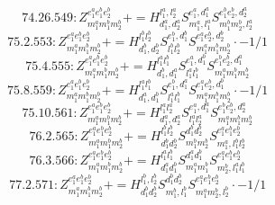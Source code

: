\documentclass[letterpaper,10pt,fleqn,leqno,onecolumn]{article}
\begin{document}
\begin{equation} \;\;\;\;\;\;  74.26.549: Z^{e_{1}^{a}e_{1}^{b}e_{2}^{b}}_{m_{1}^{a}m_{1}^{b}m_{2}^{b}}+=H^{l_{1}^{a},l_{2}^{a}}_{d_{1}^{a},d_{2}^{a}}S^{e_{1}^{a},d_{1}^{a}}_{m_{1}^{a},l_{1}^{a}}S^{e_{1}^{b}e_{2}^{b},d_{2}^{a}}_{m_{1}^{b}m_{2}^{b},l_{2}^{a}} \end{equation}
\begin{equation} \;\;\;\;\;\;  75.2.553: Z^{e_{1}^{a}e_{1}^{b}e_{2}^{b}}_{m_{1}^{a}m_{1}^{b}m_{2}^{b}}+=H^{l_{1}^{b}l_{2}^{b}}_{d_{1}^{b},d_{2}^{b}}S^{e_{1}^{b},d_{1}^{b}}_{l_{1}^{b}l_{2}^{b}}S^{e_{1}^{a}e_{2}^{b},d_{2}^{b}}_{m_{1}^{a}m_{1}^{b}m_{2}^{b}}\cdot -1/1 \end{equation}
\begin{equation} \;\;\;\;\;\;  75.4.555: Z^{e_{1}^{a}e_{1}^{b}e_{2}^{b}}_{m_{1}^{a}m_{1}^{b}m_{2}^{b}}+=H^{l_{1}^{a}l_{1}^{b}}_{d_{1}^{b},d_{1}^{a}}S^{e_{1}^{a},d_{1}^{b}}_{l_{1}^{a}l_{1}^{b}}S^{e_{1}^{b}e_{2}^{b},d_{1}^{a}}_{m_{1}^{a}m_{1}^{b}m_{2}^{b}} \end{equation}
\begin{equation} \;\;\;\;\;\;  75.8.559: Z^{e_{1}^{a}e_{1}^{b}e_{2}^{b}}_{m_{1}^{a}m_{1}^{b}m_{2}^{b}}+=H^{l_{1}^{a}l_{1}^{b}}_{d_{1}^{a},d_{1}^{b}}S^{e_{1}^{b},d_{1}^{a}}_{l_{1}^{a}l_{1}^{b}}S^{e_{1}^{a}e_{2}^{b},d_{1}^{b}}_{m_{1}^{a}m_{1}^{b}m_{2}^{b}}\cdot -1/1 \end{equation}
\begin{equation} \;\;\;\;\;\;  75.10.561: Z^{e_{1}^{a}e_{1}^{b}e_{2}^{b}}_{m_{1}^{a}m_{1}^{b}m_{2}^{b}}+=H^{l_{1}^{a}l_{2}^{a}}_{d_{1}^{a},d_{2}^{a}}S^{e_{1}^{a},d_{1}^{a}}_{l_{1}^{a}l_{2}^{a}}S^{e_{1}^{b}e_{2}^{b},d_{2}^{a}}_{m_{1}^{a}m_{1}^{b}m_{2}^{b}} \end{equation}
\begin{equation} \;\;\;\;\;\;  76.2.565: Z^{e_{1}^{a}e_{1}^{b}e_{2}^{b}}_{m_{1}^{a}m_{1}^{b}m_{2}^{b}}+=H^{l_{1}^{b}l_{2}^{b}}_{d_{1}^{b}d_{2}^{b}}S^{d_{1}^{b}d_{2}^{b}}_{m_{1}^{b}m_{2}^{b}}S^{e_{1}^{a}e_{1}^{b}e_{2}^{b}}_{m_{1}^{a},l_{1}^{b}l_{2}^{b}} \end{equation}
\begin{equation} \;\;\;\;\;\;  76.3.566: Z^{e_{1}^{a}e_{1}^{b}e_{2}^{b}}_{m_{1}^{a}m_{1}^{b}m_{2}^{b}}+=H^{l_{1}^{a}l_{1}^{b}}_{d_{1}^{a}d_{1}^{b}}S^{d_{1}^{a}d_{1}^{b}}_{m_{1}^{a}m_{1}^{b}}S^{e_{1}^{a}e_{1}^{b}e_{2}^{b}}_{m_{2}^{b},l_{1}^{a}l_{1}^{b}} \end{equation}
\begin{equation} \;\;\;\;\;\;  77.2.571: Z^{e_{1}^{a}e_{1}^{b}e_{2}^{b}}_{m_{1}^{a}m_{1}^{b}m_{2}^{b}}+=H^{l_{1}^{b},l_{2}^{b}}_{d_{1}^{b}d_{2}^{b}}S^{d_{1}^{b}d_{2}^{b}}_{m_{1}^{b},l_{1}^{b}}S^{e_{1}^{a}e_{1}^{b}e_{2}^{b}}_{m_{1}^{a}m_{2}^{b},l_{2}^{b}}\cdot -1/1 \end{equation}
\end{document}
